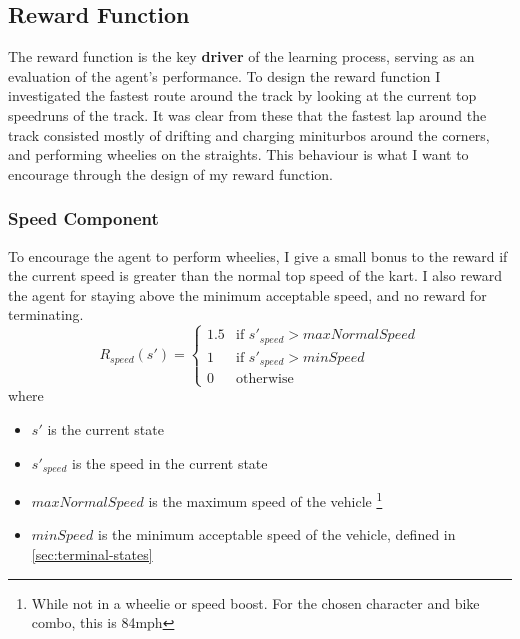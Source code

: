 \subsection{Reward Function}
The reward function is the key \textbf{driver} of the learning process, serving as an evaluation of the agent's performance. To design the reward function I investigated the fastest route around the track by looking at the current top speedruns of the track. It was clear from these that the fastest lap around the track consisted mostly of drifting and charging miniturbos around the corners, and performing wheelies on the straights. This behaviour is what I want to encourage through the  design of my reward function.
\subsubsection{Speed Component}
To encourage the agent to perform wheelies, I give a small bonus to the reward if the current speed is greater than the normal top speed of the kart. I also reward the agent for staying above the minimum acceptable speed, and no reward for terminating.
\[
R_{speed}(s') = 
\begin{cases}
 1.5 & \text{if } s'_{speed} > maxNormalSpeed\\
 1 & \text{if } s'_{speed} > minSpeed\\
 0 & \text{otherwise}
\end{cases}
\]
where
\begin{itemize}
    \item $s'$ is the current state 
    \item $s'_{speed}$ is the speed in the current state
    \item $maxNormalSpeed$ is the maximum speed of the vehicle \footnote{While not in a wheelie or speed boost. For the chosen character and bike combo, this is 84mph}
    \item $minSpeed$ is the minimum acceptable speed of the vehicle, defined in \ref{sec:terminal-states}
\end{itemize}
